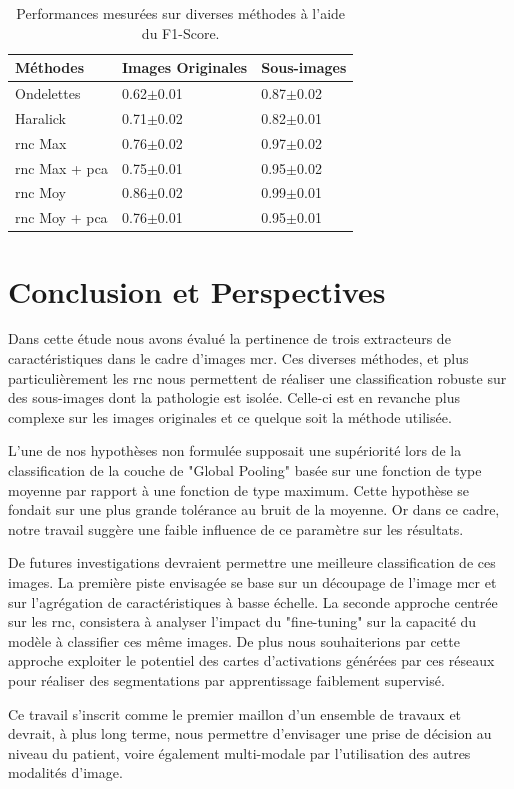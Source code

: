 \documentclass{gretsi}
\begin{document}
\begin{sloppypar}
\begin{table}[h]
\centering
    \begin{tabular*}{\linewidth}{l@{\extracolsep{\fill}}ll}
        \hline
        \textbf{Méthodes} & \textbf{Images Originales} & \textbf{Sous-images}\\
        \hline
        Ondelettes & 0.62$\pm$0.01 & 0.87$\pm$0.02\\
        \hline
        Haralick & 0.71$\pm$0.02 & 0.82$\pm$0.01\\
        \hline
        \ac{rnc} Max & 0.76$\pm$0.02 & 0.97$\pm$0.02\\
        \hline
        \ac{rnc} Max + \ac{pca} & 0.75$\pm$0.01 & 0.95$\pm$0.02\\
        \hline
        \ac{rnc} Moy & 0.86$\pm$0.02 &0.99$\pm$0.01\\
        \hline
       \ac{rnc} Moy + \ac{pca} & 0.76$\pm$0.01 & 0.95$\pm$0.01\\
    \end{tabular*}
    \caption{Performances mesurées sur diverses méthodes à l'aide du F1-Score.}
    \label{scores}
\end{table}

\section{Conclusion et Perspectives}
\label{conclusion}
Dans cette étude nous avons évalué la pertinence de trois extracteurs de caractéristiques dans le cadre d'images \ac{mcr}. Ces diverses méthodes, et plus particulièrement les \ac{rnc} nous permettent de réaliser une classification robuste sur des sous-images dont la pathologie est isolée. Celle-ci est en revanche plus complexe sur les images originales et ce quelque soit la méthode utilisée.\par 
L'une de nos hypothèses non formulée supposait une supériorité lors de la classification de la couche de "Global Pooling" basée sur une fonction de type moyenne par rapport à une fonction de type maximum. Cette hypothèse se fondait sur une plus grande tolérance au bruit de la moyenne. Or dans ce cadre, notre travail suggère une faible influence de ce paramètre sur les résultats.\par
De futures investigations devraient permettre une meilleure classification de ces images. La première piste envisagée se base sur un découpage de l'image \ac{mcr} et sur l'agrégation de caractéristiques à basse échelle. La seconde approche centrée sur les \acs{rnc}, consistera à analyser l'impact du "fine-tuning" sur la capacité du modèle à classifier ces même images. De plus nous souhaiterions par cette approche exploiter le potentiel des cartes d'activations générées par ces réseaux pour réaliser des segmentations par apprentissage faiblement supervisé.\par
Ce travail s'inscrit comme le premier maillon d'un ensemble de travaux et devrait, à plus long terme, nous permettre d'envisager une prise de décision au niveau du patient, voire également multi-modale par l'utilisation des autres modalités d'image.\par


\end{sloppypar}
\end{document}
